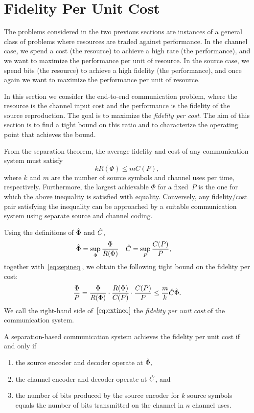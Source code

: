 \section{Fidelity Per Unit Cost}
\label{sec:fidcostbound}

The problems considered in the two previous sections are instances of a general
class of problems where resources are traded against performance.  In the
channel case, we spend a cost (the resource) to achieve a high rate
(the performance), and we want to maximize the
performance per unit of resource. In the source case, we spend bits (the
resource) to achieve a high fidelity (the performance), and once again we want
to maximize the performance per unit of resource.  

In this section we consider the end-to-end communication problem, where the
resource is the channel input cost and the performance is the fidelity of the
source reproduction. The goal is to maximize the \emph{fidelity per cost}. The
aim of this section is to find a tight bound on this ratio and  to characterize
the operating point that achieves the bound.

From the separation theorem, the average fidelity and cost of any communication
system must satisfy
\begin{equation}
  \label{eq:sepineq}
  k R(\Phi) \le m C(P),
\end{equation}
where $k$ and $m$ are the number of source symbols and channel uses per time,
respectively. Furthermore, the largest achievable $\Phi$ for a fixed~$P$ is the
one for which the above inequality is satisfied with equality.
Conversely, any fidelity/cost pair satisfying the inequality can
be approached by a suitable communication system using separate source and
channel coding.

Using the definitions of ${\hat{\Phi}}$ and ${\hat{C}}$,
\begin{align*}
  {\hat{\Phi}} &= \sup_\Phi \frac{\Phi}{R(\Phi)} & {\hat{C}} &= \sup_P \frac{C(P)}{P},
\end{align*}
together with~\eqref{eq:sepineq}, we obtain the following tight bound on the
fidelity per cost:
\begin{equation}
  \label{eq:extineq}
\frac\Phi P = \frac\Phi{R(\Phi)} \cdot \frac{R(\Phi)}{C(P)} \cdot
\frac{C(P)}{P} \le \frac mk {\hat{C}} {\hat{\Phi}}.
\end{equation}
We call the right-hand side of~$\eqref{eq:extineq}$ the \emph{fidelity per unit
cost} of the communication system.

A separation-based communication system achieves the fidelity per unit cost if
and only if 
\begin{enumerate}
\item the source encoder and decoder operate at ${\hat{\Phi}},$
\item the channel encoder and decoder operate at ${\hat{C}}$, and
\item the number of bits produced by the source encoder for $k$ source symbols
  equals the number of bits transmitted on the channel in $n$ channel uses. 
\end{enumerate}


